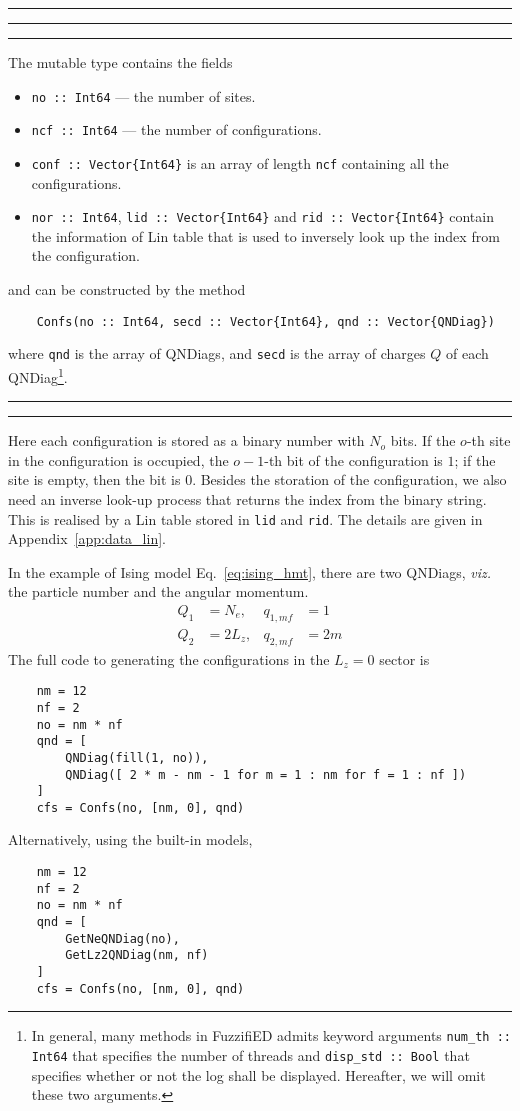 \documentclass{timesjhep}
\newenvironment{block}[1]{\vspace{0.4\baselineskip}\hrule\vspace{0.10\baselineskip}\hrule\vspace{0.30\baselineskip}{\bfseries #1}\vspace{0.2\baselineskip}\hrule\vspace{0.3\baselineskip}
}{\vspace{0.2\baselineskip}\hrule\vspace{0.10\baselineskip}\hrule\vspace{0.5\baselineskip}}
\begin{document}
\begin{block}{\lstinline|Confs| --- Type}
The mutable type contains the fields
\begin{itemize}
    \item \lstinline|no :: Int64| --- the number of sites.
    \item \lstinline|ncf :: Int64| --- the number of configurations.
    \item \lstinline|conf :: Vector{Int64}| is an array of length \lstinline|ncf| containing all the configurations. 
    \item \lstinline|nor :: Int64|, \lstinline|lid :: Vector{Int64}| and \lstinline|rid :: Vector{Int64}| contain the information of Lin table that is used to inversely look up the index from the configuration. 
\end{itemize}
and can be constructed by the method 
\begin{lstlisting}
    Confs(no :: Int64, secd :: Vector{Int64}, qnd :: Vector{QNDiag})
\end{lstlisting}
where \lstinline|qnd| is the array of QNDiags, and \lstinline|secd| is the array of charges $Q$ of each QNDiag\footnote{In general, many methods in FuzzifiED admits keyword arguments \lstinline[basicstyle=\ttfamily\scriptsize]|num_th :: Int64| that specifies the number of threads and \lstinline[basicstyle=\ttfamily\scriptsize]|disp_std :: Bool| that specifies whether or not the log shall be displayed. Hereafter, we will omit these two arguments.}.
\end{block}

Here each configuration is stored as a binary number with $N_o$ bits. If the $o$-th site in the configuration is occupied, the $o-1$-th bit of the configuration is $1$; if the site is empty, then the bit is $0$. Besides the storation of the configuration, we also need an inverse look-up process that returns the index from the binary string. This is realised by a Lin table stored in \lstinline|lid| and \lstinline|rid|. The details are given in Appendix~\ref{app:data_lin}. 

In the example of Ising model Eq.~\eqref{eq:ising_hmt}, there are two QNDiags, \textit{viz.} the particle number and the angular momentum. 
\begin{align}
    Q_1&=N_e,& q_{1,mf}&=1\nonumber\\
    Q_2&=2L_z,&q_{2,mf}&=2m
\end{align}
The full code to generating the configurations in the $L_z=0$ sector is 
\begin{lstlisting}
    nm = 12
    nf = 2
    no = nm * nf
    qnd = [ 
        QNDiag(fill(1, no)), 
        QNDiag([ 2 * m - nm - 1 for m = 1 : nm for f = 1 : nf ])
    ]
    cfs = Confs(no, [nm, 0], qnd)
\end{lstlisting}
Alternatively, using the built-in models, 
\begin{lstlisting}
    nm = 12
    nf = 2
    no = nm * nf
    qnd = [ 
        GetNeQNDiag(no), 
        GetLz2QNDiag(nm, nf) 
    ]
    cfs = Confs(no, [nm, 0], qnd)
\end{lstlisting}
\end{document}
